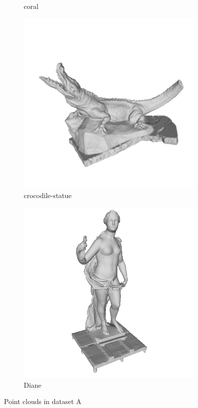 \begin{figure}[H]
\begin{subfigure}[b]{0.23\linewidth}
		\caption{coral}
	\end{subfigure}
	\begin{subfigure}[b]{0.23\linewidth}
		\includegraphics[width=\linewidth]{./Figures/train-dataset/14.crocodile-statue.png}
		\caption{crocodile-statue}
	\end{subfigure}
	\begin{subfigure}[b]{0.23\linewidth}
		\includegraphics[width=\linewidth]{./Figures/train-dataset/15.diane.png}
		\caption{Diane}
	\end{subfigure}

	\label{fig:dataset_a}
\caption{Point clouds in dataset A }
\end{figure}


